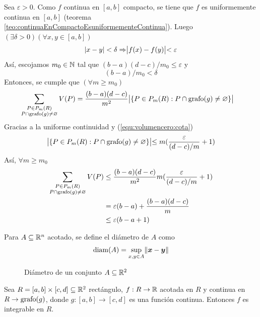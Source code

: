 \begin{demostracion}
Sea $\varepsilon > 0 $. Como $ f $ continua en $ [a,b] $ compacto, se tiene que $ f $ es uniformemente continua en $ [a,b] $ (teorema \ref{teo:continuaEnCompactoEsuniformementeContinua}). Luego $ (\exists \delta > 0) (\forall x,y \in [a,b]) $
\[ \left\lvert x-y\right\rvert<\delta \Rightarrow \bigr\lvert f(x)-f(y)\bigl\rvert < \varepsilon \]
As\'i, escojamos $m_0\in \mathbb{N}$ tal que $ (b-a)(d-c)/m_0 \leq \varepsilon $ y
\begin{equation}\label{equ:volumencero:cota}
    (b-a)/m_0 < \delta
\end{equation}
Entonces, se cumple que $ (\forall m \geq m_0 ) $
\begin{align*}
\sum_{\substack{P \in P_{m}(R) \\ P \cap \operatorname{grafo}(g) \neq
\varnothing}} V(P)
    &= \frac{(b-a)(d-c)}{m^2} \bigr\lvert\{ P \in P_{m}(R) : P \cap
    \operatorname{grafo}(g) \neq \varnothing \}\bigl\rvert
\end{align*}
Gracias a la uniforme continuidad y (\ref{equ:volumencero:cota})
\[
\bigr\lvert\{ P \in P_{m}(R) : P \cap \operatorname{grafo}(g) \neq \varnothing \}\bigl\rvert
\leq m (\frac{\varepsilon}{(d-c)/m} + 1)
\] %
As\'i, $ \forall m \geq m_0 $
\begin{align*}
\sum_{\substack{P \in P_{m}(R) \\ P \cap \operatorname{grafo}(g) \neq
\varnothing}} V(P)
    &\leq \frac{(b-a)(d-c)}{m^2} m (\frac{\varepsilon}{(d-c)/m} + 1) \\
    &= \varepsilon (b-a) + \frac{(b-a)(d-c)}{m} \\
    &\leq \varepsilon (b-a +1)
\end{align*}

\end{demostracion}

Para $ A \subseteq \mathbb{R}^n $ acotado, se define el di\'ametro de $ A $ como
\[\operatorname{diam}(A) = \sup_{x,y \in A} \lVert\boldsymbol{x}-\boldsymbol{y}\rVert\]
\begin{figure}[H]
	\centering
	
	\caption{Di\'ametro de un conjunto $ A \subseteq \mathbb{R}^2 $}
\end{figure}

\begin{proposicion}
Sea $ R = [a,b] \times [c,d] \subseteq \mathbb{R}^2 $ rect\'angulo, $ f:R
\to \mathbb{R} $ acotada en $ R $ y continua en $ R \rightarrow \operatorname{grafo}(g) $,
donde $ g: [a,b] \to [c,d] $ es una funci\'on continua. Entonces $ f
$ es integrable en $ R $.
\end{proposicion}

